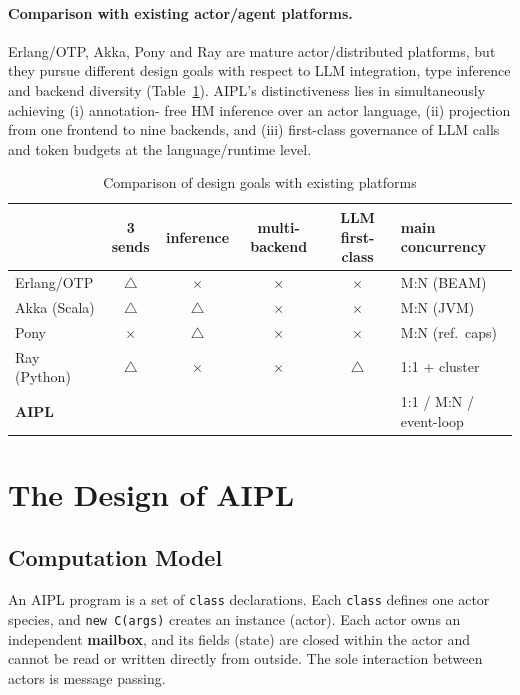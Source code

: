 \documentclass[11pt,a4paper]{article}
\newcommand{\Yes}{\textcolor{green!50!black}{\textbf{\checkmark}}}
\newcommand{\No}{\textcolor{red!70!black}{$\times$}}
\newcommand{\Part}{\textcolor{orange!80!black}{$\triangle$}}
\newcommand{\code}[1]{\texttt{\small #1}}
\begin{document}
\paragraph{Comparison with existing actor/agent platforms.}
Erlang/OTP, Akka, Pony and Ray are mature actor/distributed platforms,
but they pursue different design goals with respect to LLM integration,
type inference and backend diversity (Table~\ref{tab:compare}).
AIPL's distinctiveness lies in simultaneously achieving (i) annotation-
free HM inference over an actor language, (ii) projection from one
frontend to nine backends, and (iii) first-class governance of LLM calls
and token budgets at the language/runtime level.

\begin{table}[h]
\centering\small
\caption{Comparison of design goals with existing platforms}\label{tab:compare}
\begin{tabularx}{\linewidth}{@{}l c c c c X@{}}
\toprule
 & 3 sends & inference & multi-backend & LLM first-class & main concurrency \\
\midrule
Erlang/OTP & \Part & \No & \No & \No & M:N (BEAM) \\
Akka (Scala) & \Part & \Part & \No & \No & M:N (JVM) \\
Pony & \No & \Part & \No & \No & M:N (ref.\ caps) \\
Ray (Python) & \Part & \No & \No & \Part & 1:1 + cluster \\
\textbf{AIPL} & \Yes & \Yes & \Yes & \Yes & 1:1 / M:N / event-loop \\
\bottomrule
\end{tabularx}
\end{table}

\section{The Design of AIPL}\label{sec:design}

\subsection{Computation Model}
An AIPL program is a set of \code{class} declarations. Each
\code{class} defines one actor species, and \code{new C(args)} creates
an instance (actor). Each actor owns an independent \textbf{mailbox},
and its fields (state) are closed within the actor and cannot be read or
written directly from outside. The sole interaction between actors is
message passing.
\end{document}
